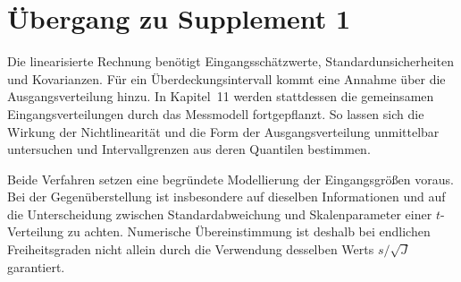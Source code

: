 \section{Übergang zu Supplement 1}

Die linearisierte Rechnung benötigt Eingangsschätzwerte,
Standardunsicherheiten und Kovarianzen. Für ein Überdeckungsintervall
kommt eine Annahme über die Ausgangsverteilung hinzu.
In Kapitel~11 werden stattdessen die gemeinsamen Eingangsverteilungen
durch das Messmodell fortgepflanzt. So lassen sich die Wirkung der
Nichtlinearität und die Form der Ausgangsverteilung unmittelbar untersuchen
und Intervallgrenzen aus deren Quantilen bestimmen.

Beide Verfahren setzen eine begründete Modellierung der Eingangsgrößen
voraus. Bei der Gegenüberstellung ist insbesondere auf dieselben
Informationen und auf die Unterscheidung zwischen Standardabweichung und
Skalenparameter einer $t$-Verteilung zu achten. Numerische Übereinstimmung
ist deshalb bei endlichen Freiheitsgraden nicht allein durch die Verwendung
desselben Werts $s/\sqrt J$ garantiert.
